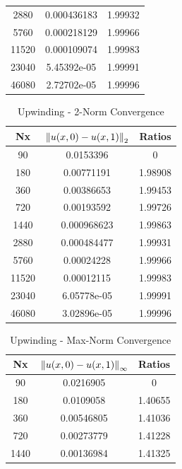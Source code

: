 \documentclass[12pt]{article}
\begin{document}
\begin{enumerate}[(a)]
\begin{minipage}{0.5\textwidth}
\begin{table}[H]
\begin{tabular}{||c|cc||}
  2880 &    0.000436183 &  1.99932 \\
  5760 &    0.000218129 &  1.99966 \\
 11520 &    0.000109074 &  1.99983 \\
 23040 &    5.45392e-05 &  1.99991 \\
 46080 &    2.72702e-05 &  1.99996 \\
\hline \hline
\end{tabular}
\end{table}
\end{minipage}%
\begin{minipage}{0.5\textwidth}
\begin{table}[H]
\caption{Upwinding - 2-Norm Convergence}
\centering\begin{tabular}{||c|cc||}
\hline \hline
    Nx &   $\norm{u(x,0)-u(x,1)}_2$ &   Ratios \\
\hline
    90 &    0.0153396   &  0       \\
   180 &    0.00771191  &  1.98908 \\
   360 &    0.00386653  &  1.99453 \\
   720 &    0.00193592  &  1.99726 \\
  1440 &    0.000968623 &  1.99863 \\
  2880 &    0.000484477 &  1.99931 \\
  5760 &    0.00024228  &  1.99966 \\
 11520 &    0.00012115  &  1.99983 \\
 23040 &    6.05778e-05 &  1.99991 \\
 46080 &    3.02896e-05 &  1.99996 \\
\hline \hline
\end{tabular}
\end{table}
\end{minipage}
\begin{minipage}{0.5\textwidth}
\begin{table}[H]
\caption{Upwinding - Max-Norm Convergence}
\centering\begin{tabular}{||c|cc||}
\hline \hline
    Nx &   $\norm{u(x,0)-u(x,1)}_\infty$ &   Ratios \\
\hline
    90 &      0.0216905   &  0       \\
   180 &      0.0109058   &  1.40655 \\
   360 &      0.00546805  &  1.41036 \\
   720 &      0.00273779  &  1.41228 \\
  1440 &      0.00136984  &  1.41325 \\

\end{tabular}
\end{table}
\end{minipage}
\end{enumerate}
\end{document}
